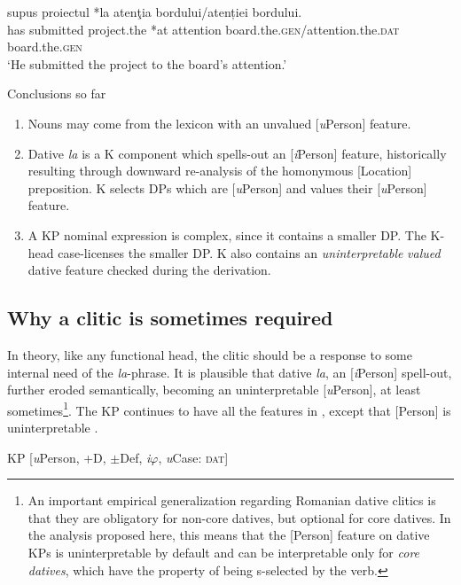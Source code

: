 \documentclass[output=paper,modfonts,nonflat,newtxmath]{langsci/langscibook}
\begin{document}
\ea%
      \label{ex:cornilescu:16}
       {supus} {proiectul} *{la} {atenţia} bordului/{atenției} {bordului}. \\
            has submitted project.the *at attention board.the.\textsc{gen}/attention.the.\textsc{dat} board.the.\textsc{gen}\\
      \glt  ‘He submitted the project to the board’s attention.’
   \z

 {Conclusions} {so} {far}
 \begin{enumerate}
	\item Nouns may come from the lexicon with an unvalued [\textit{u}Person] feature. 
	\item Dative \textit{la} is a K component which spells-out an [\textit{i}Person] feature, historically resulting through downward re-analysis of the homonymous [Location] preposition. K selects DPs which are [\textit{u}Person] and values their [\textit{u}Person] feature.
	\item A KP nominal expression is complex, since it contains a smaller DP. The K-head case-licenses the smaller DP. K also contains an \textit{uninterpretable} \textit{valued} dative feature checked during the derivation.
	\end{enumerate}

\subsection{Why a clitic is sometimes required}

In theory, like any functional head, the clitic should be a response to some internal need of the \textit{la}-phrase. It is plausible that dative \textit{la}, an [\textit{i}Person] spell-out, further eroded semantically, becoming an uninterpretable [\textit{u}Person], at least sometimes\footnote{An important empirical generalization \citep{Cornilescu2017} regarding Romanian dative clitics is that they are obligatory for non-core datives, but optional for core datives. In the analysis proposed here, this means that the [Person] feature on dative KPs is uninterpretable by default and can be interpretable only for \textit{core} \textit{datives}, which have the property of being s-selected by the verb.}. The KP continues to have all the features in , except that [Person] is uninterpretable .

\ea%
      \label{ex:cornilescu:17}
      KP [\textit{u}Person, +D, ${\pm}$Def, \textit{i}${\varphi}$, \textit{u}Case: \textsc{dat}]
      \z
\end{document}
